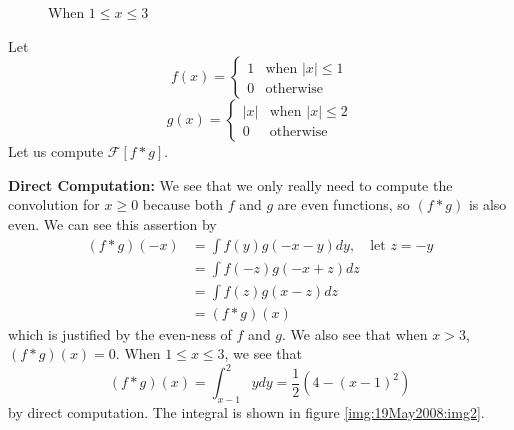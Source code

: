 \begin{ex}
\begin{figure}[hb!]
\caption{When $1\leq x\leq3$}\label{img:19May2008:img2}
\end{figure}
Let
\begin{equation*}
f(x) = \begin{cases}1 &\text{when }|x|\leq1\\
0&\text{otherwise}\end{cases}
\end{equation*}
\begin{equation*}
g(x) = \begin{cases}|x| &\text{when }|x|\leq2\\
0&\text{otherwise}\end{cases}
\end{equation*}
Let us compute $\mathcal{F}[f*g]$.

\textbf{Direct Computation:} We see that we only really need
to compute the convolution for $x\geq0$ because both $f$ and
$g$ are even functions, so $(f*g)$ is also even. We can see
this assertion by
\begin{align*}
(f*g)(-x) &= \int f(y)g(-x-y)dy,\quad\text{let }z=-y\\
&= \int f(-z)g(-x+z)dz\\
&= \int f(z)g(x-z)dz\\
&= (f*g)(x)
\end{align*}
which is justified by the even-ness of $f$ and $g$. We also
see that when $x>3$, $(f*g)(x)=0$.
When $1\leq x\leq 3$, we see that
\begin{equation}
(f*g)(x) = \int^{2}_{x-1}ydy = \frac{1}{2}(4-(x-1)^2)
\end{equation}
by direct computation. The integral is shown in figure \eqref{img:19May2008:img2}.


\end{ex}
